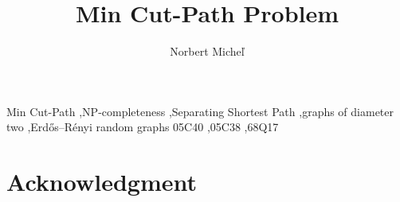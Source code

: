 \documentclass[preprint,12pt]{elsarticle}
\begin{document}
\begin{frontmatter}

\title{Min Cut-Path Problem}

\author[upjs]{Norbert Micheľ}


\begin{abstract}

\end{abstract}

\begin{keyword}
Min Cut-Path \sep NP-completeness \sep Separating Shortest Path \sep graphs of diameter two \sep Erdős--Rényi random graphs
\MSC[2020] 05C40 \sep 05C38 \sep 68Q17
\end{keyword}

\end{frontmatter}









\section*{Acknowledgment}





\end{document}
